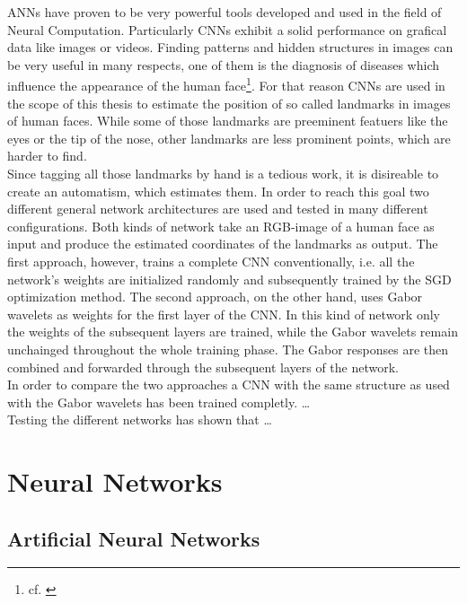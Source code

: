 \documentclass[11pt, a4paper]{article}
\begin{document}
\acp{ANN} have proven to be very powerful tools developed and used in the field of Neural Computation. Particularly \acp{CNN} exhibit a solid performance on grafical data like images or videos. Finding patterns and hidden structures in images can be very useful in many respects, one of them is the diagnosis of diseases which influence the appearance of the human face\footnote{cf. \cite{ebgm}}. For that reason \acp{CNN} are used in the scope of this thesis to estimate the position of so called landmarks in images of human faces. While some of those landmarks are preeminent featuers like the eyes or the tip of the nose, other landmarks are less prominent points, which are harder to find.\\
Since tagging all those landmarks by hand is a tedious work, it is disireable to create an automatism, which estimates them. In order to reach this goal two different general network architectures are used and tested in many different configurations. Both kinds of network take an RGB-image of a human face as input and produce the estimated coordinates of the landmarks as output. The first approach, however, trains a complete \ac{CNN} conventionally, i.e. all the network's weights are initialized randomly and subsequently trained by the \ac{SGD} optimization method. The second approach, on the other hand, uses Gabor wavelets as weights for the first layer of the \ac{CNN}. In this kind of network only the weights of the subsequent layers are trained, while the Gabor wavelets remain unchainged throughout the whole training phase. The Gabor responses are then combined and forwarded through the subsequent layers of the network.\\
In order to compare the two approaches a \ac{CNN} with the same structure as used with the Gabor wavelets has been trained completly. \dots\\%
Testing the different networks has shown that \dots%


\newpage

\section{Neural Networks}

\subsection{Artificial Neural Networks}
\end{document}
